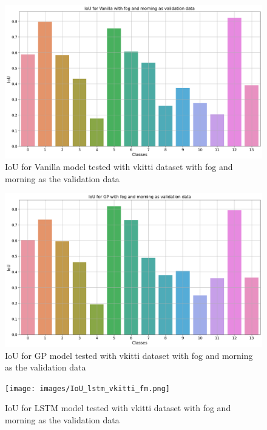 	\begin{figure}
		\centering
	
		\includegraphics[width=13cm]{images/IoU_vanilla_vkitti_fm.png}
		\caption{IoU for Vanilla model tested with vkitti dataset with fog and morning as the validation data}
		\label{fig:performance_metric_vkitti_two_class_box_plot}
	\end{figure}

	\begin{figure}
		\centering
	
		\includegraphics[width=13cm]{images/IoU_gp_vkitti_fm.png}
		\caption{IoU for GP model tested with vkitti dataset with fog and morning as the validation data}
		\label{fig:performance_metric_vkitti_two_class_box_plot}
	\end{figure}

	\begin{figure}
		\centering
	
		\texttt{[image: images/IoU\_lstm\_vkitti\_fm.png]}
		\caption{IoU for LSTM model tested with vkitti dataset with fog and morning as the validation data}
		\label{fig:performance_metric_vkitti_two_class_box_plot}
	\end{figure}	
	
